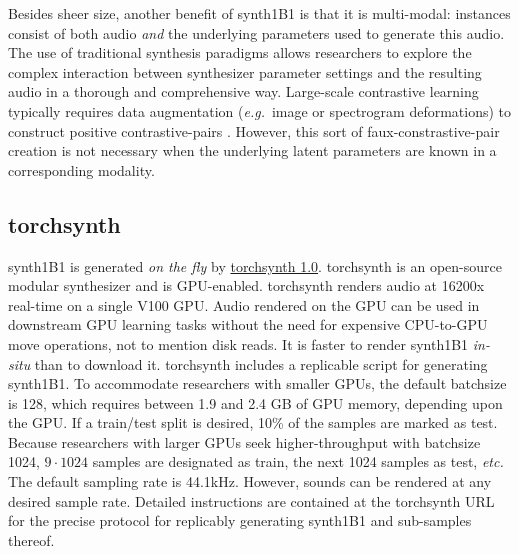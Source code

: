 Besides sheer size, another benefit of synth1B1 is that it is multi-modal: instances consist of both audio {\em and} the underlying parameters used to generate this audio. The use of traditional synthesis paradigms allows researchers to explore the complex interaction between synthesizer parameter settings and the resulting audio in a thorough and comprehensive way. 
Large-scale contrastive learning typically requires data augmentation ({\em e.g.}\ image or spectrogram deformations) to construct positive contrastive-pairs \cite{pmlr-v119-chen20j,DBLP:journals/corr/abs-2103-06695}. However, this sort of faux-constrastive-pair creation is not necessary when the underlying latent parameters are known in a corresponding modality.

\subsection{torchsynth}

synth1B1 is generated {\em on the fly} by \href{https://github.com/torchsynth/torchsynth}{torchsynth 1.0}.
torchsynth is an open-source modular synthesizer and is GPU-enabled. torchsynth renders audio at 16200x real-time on a single V100 GPU. Audio rendered on the GPU can be used in downstream GPU learning tasks without the need for expensive CPU-to-GPU move operations, not to mention disk reads. It is faster to render synth1B1 {\em in-situ} than to download it. torchsynth includes a replicable script for generating synth1B1.
To accommodate researchers with smaller GPUs, the default batchsize is 128, which requires between 1.9 and 2.4 GB of GPU memory, depending upon the GPU.
If a train/test split is desired, 10\% of the samples are marked as test. Because researchers with larger GPUs seek higher-throughput with batchsize 1024, $9 \cdot 1024$ samples are designated as train, the next 1024 samples as test, {\em etc.} The default sampling rate is 44.1kHz. However, sounds can be rendered at any desired sample rate. %
Detailed instructions are contained at the torchsynth URL for the precise protocol for replicably generating synth1B1 and sub-samples thereof. %

